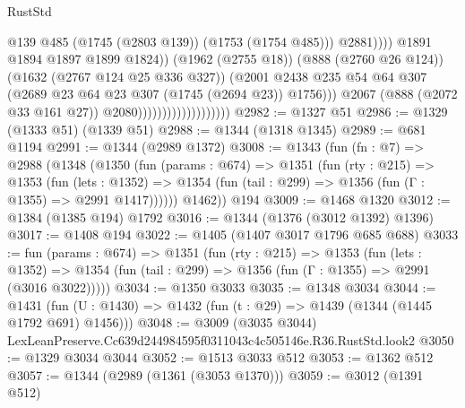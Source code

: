 \begin{lexlean}{RustStd}
\begin{coremodule}
                                                          @139
                                                          @485
                                                          (@1745 (@2803 @139))
                                                          (@1753 (@1754 @485)))
                                                        @2881))))
                                                @1891
                                                @1894
                                                @1897
                                                @1899
                                                @1824))
                                            (@1962 (@2755 @18))
                                            (@888 (@2760 @26 @124))
                                            (@1632 (@2767 @124 @25 @336 @327))
                                            (@2001
                                              @2438
                                              @235
                                              @54
                                              @64
                                              @307
                                              (@2689 @23 @64 @23 @307 (@1745 (@2694 @23)) @1756)))
                                          @2067
                                          (@888 (@2072 @33 @161 @27))
                                          @2080)))))))))))))))))))
@2982 := @1327 @51
@2986 := @1329 (@1333 @51) (@1339 @51)
@2988 := @1344 (@1318 @1345)
@2989 := @681 @1194
@2991 := @1344 (@2989 @1372)
@3008 := @1343
    (fun (fn : @7) =>
    @2988
      (@1348
        (@1350
          (fun (params : @674) =>
          @1351
            (fun (rty : @215) =>
            @1353
              (fun (lets : @1352) =>
              @1354 (fun (tail : @299) => @1356 (fun (Γ : @1355) => @2991 @1417))))))
        @1462))
    @194
@3009 := @1468 @1320
@3012 := @1384 (@1385 @194) @1792
@3016 := @1344 (@1376 (@3012 @1392) @1396)
@3017 := @1408 @194
@3022 := @1405 (@1407 @3017 @1796 @685 @688)
@3033 := fun (params : @674) =>
  @1351
    (fun (rty : @215) =>
    @1353
      (fun (lets : @1352) =>
      @1354 (fun (tail : @299) => @1356 (fun (Γ : @1355) => @2991 (@3016 @3022)))))
@3034 := @1350 @3033
@3035 := @1348 @3034
@3044 := @1431 (fun (U : @1430) => @1432 (fun (t : @29) => @1439 (@1344 (@1445 @1792 @691) @1456)))
@3048 := @3009 (@3035 @3044) LexLeanPreserve.Cc639d244984595f0311043c4c505146e.R36.RustStd.look2
@3050 := @1329 @3034 @3044
@3052 := @1513 @3033 @512
@3053 := @1362 @512
@3057 := @1344 (@2989 (@1361 (@3053 @1370)))
@3059 := @3012 (@1391 @512)

\end{coremodule}
\end{lexlean}
